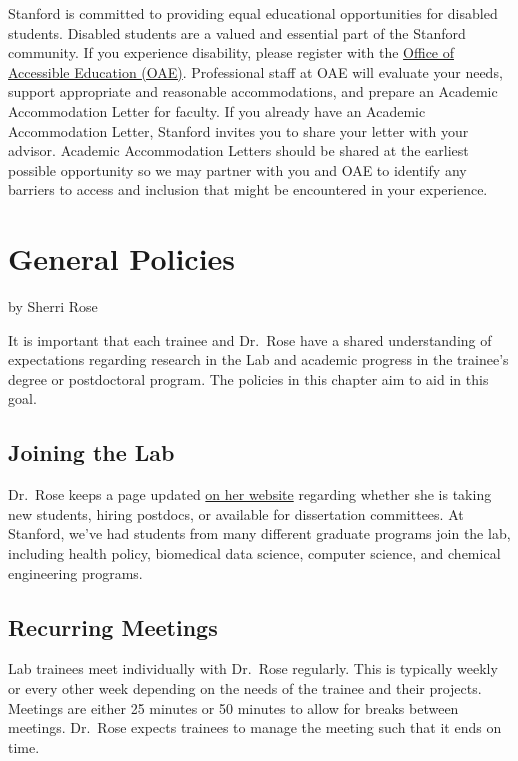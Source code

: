 \documentclass[
]{book}
\begin{document}
Stanford is committed to providing equal educational opportunities for disabled students. Disabled students are a valued and essential part of the Stanford community. If you experience disability, please register with the \href{https://oae.stanford.edu/}{Office of Accessible Education (OAE)}. Professional staff at OAE will evaluate your needs, support appropriate and reasonable accommodations, and prepare an Academic Accommodation Letter for faculty. If you already have an Academic Accommodation Letter, Stanford invites you to share your letter with your advisor. Academic Accommodation Letters should be shared at the earliest possible opportunity so we may partner with you and OAE to identify any barriers to access and inclusion that might be encountered in your experience.

\hypertarget{general-policies}{%
\chapter{General Policies}\label{general-policies}}

by Sherri Rose

It is important that each trainee and Dr.~Rose have a shared understanding of expectations regarding research in the Lab and academic progress in the trainee's degree or postdoctoral program. The policies in this chapter aim to aid in this goal.

\hypertarget{joining-the-lab}{%
\section{Joining the Lab}\label{joining-the-lab}}

Dr.~Rose keeps a page updated \href{http://drsherrirose.org/new-students-and-postdocs}{on her website} regarding whether she is taking new students, hiring postdocs, or available for dissertation committees. At Stanford, we've had students from many different graduate programs join the lab, including health policy, biomedical data science, computer science, and chemical engineering programs.

\hypertarget{recurring-meetings}{%
\section{Recurring Meetings}\label{recurring-meetings}}

Lab trainees meet individually with Dr.~Rose regularly. This is typically weekly or every other week depending on the needs of the trainee and their projects. Meetings are either 25 minutes or 50 minutes to allow for breaks between meetings. Dr.~Rose expects trainees to manage the meeting such that it ends on time.
\end{document}
